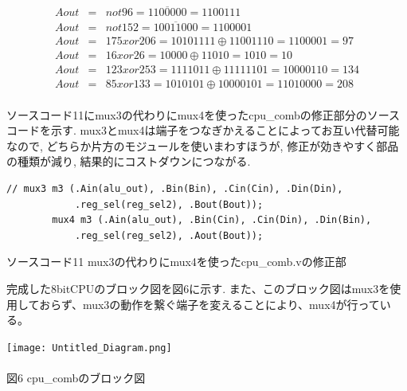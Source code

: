 \documentclass[12pt]{jreport}
\begin{document}
\begin{eqnarray*}
            Aout &=& not 96 = \overline{1100000} = 1100111 \\
            Aout &=& not 152 = \overline{10011000} = 1100001 \\
            Aout &=& 175 xor 206 = 10101111 \oplus 11001110 = 1100001 = 97 \\
            Aout &=& 16 xor 26 = 10000 \oplus 11010 = 1010 = 10 \\
            Aout &=& 123 xor 253 = 1111011 \oplus 11111101 = 10000110 = 134 \\
            Aout &=& 85 xor 133 = 1010101 \oplus 10000101 = 11010000 = 208 \\
        \end{eqnarray*}

        ソースコード11にmux3の代わりにmux4を使ったcpu\_combの修正部分のソースコードを示す. mux3とmux4は端子をつなぎかえることによってお互い代替可能なので, どちらか片方のモジュールを使いまわすほうが, 修正が効きやすく部品の種類が減り, 結果的にコストダウンにつながる. 
         \begin{center}
            \begin{lstlisting}[basicstyle=\ttfamily\footnotesize, frame=single]
        // mux3 m3 (.Ain(alu_out), .Bin(Bin), .Cin(Cin), .Din(Din),
            .reg_sel(reg_sel2), .Bout(Bout));
        mux4 m3 (.Ain(alu_out), .Bin(Cin), .Cin(Din), .Din(Bin),
            .reg_sel(reg_sel2), .Aout(Bout));
            \end{lstlisting}
            ソースコード11 mux3の代わりにmux4を使ったcpu\_comb.vの修正部
        \end{center}
        完成した8bitCPUのブロック図を図6に示す. また、このブロック図はmux3を使用しておらず、mux3の動作を繋ぐ端子を変えることにより、mux4が行っている。
        \begin{center}
            \texttt{[image: Untitled\_Diagram.png]} \\　\\
                図6 cpu\_combのブロック図
        \end{center}
\end{document}
